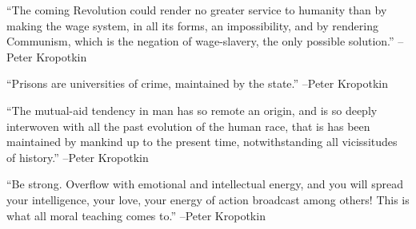 \documentclass{article}%
\begin{document}
\linebreak%
\vspace{1mm}%
\begin{minipage}{\textwidth}%
\flushleft%
“The coming Revolution could render no greater service to humanity than by making the wage system, in all its forms, an impossibility, and by rendering Communism, which is the negation of wage{-}slavery, the only possible solution.”%
\linebreak%
\vspace{1mm}%
–Peter Kropotkin%
\linebreak%
\vspace{1mm}%
\end{minipage}%
\linebreak%
\vspace{1mm}%
\begin{minipage}{\textwidth}%
\flushleft%
“Prisons are universities of crime, maintained by the state.”%
\linebreak%
\vspace{1mm}%
–Peter Kropotkin%
\linebreak%
\vspace{1mm}%
\end{minipage}%
\linebreak%
\vspace{1mm}%
\begin{minipage}{\textwidth}%
\flushleft%
“The mutual{-}aid tendency in man has so remote an origin, and is so deeply interwoven with all the past evolution of the human race, that is has been maintained by mankind up to the present time, notwithstanding all vicissitudes of history.”%
\linebreak%
\vspace{1mm}%
–Peter Kropotkin%
\linebreak%
\vspace{1mm}%
\end{minipage}%
\linebreak%
\vspace{1mm}%
\begin{minipage}{\textwidth}%
\flushleft%
“Be strong. Overflow with emotional and intellectual energy, and you will spread your intelligence, your love, your energy of action broadcast among others! This is what all moral teaching comes to.”%
\linebreak%
\vspace{1mm}%
–Peter Kropotkin%
\linebreak%
\vspace{1mm}%
\end{minipage}%
\end{document}
